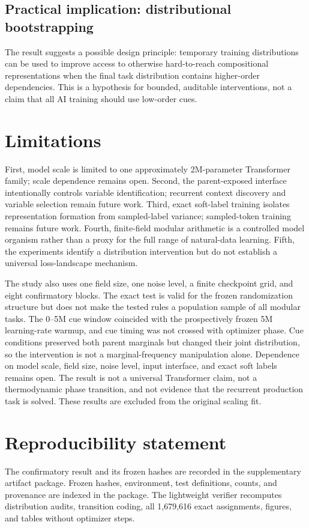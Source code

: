\documentclass[11pt]{article}
\begin{document}
\subsection{Practical implication: distributional bootstrapping}
The result suggests a possible design principle: temporary training
distributions can be used to improve access to otherwise hard-to-reach
compositional representations when the final task distribution contains
higher-order dependencies. This is a hypothesis for bounded, auditable
interventions, not a claim that all AI training should use low-order cues.

\section{Limitations}
First, model scale is limited to one approximately 2M-parameter Transformer
family; scale dependence remains open. Second, the parent-exposed interface
intentionally controls variable identification; recurrent context discovery
and variable selection remain future work. Third, exact soft-label training
isolates representation formation from sampled-label variance; sampled-token
training remains future work. Fourth, finite-field modular arithmetic is a
controlled model organism rather than a proxy for the full range of
natural-data learning. Fifth, the experiments identify a distribution
intervention but do not establish a universal loss-landscape mechanism.

The study also uses one field size, one noise level, a finite checkpoint grid,
and eight confirmatory blocks. The exact test is valid for the frozen
randomization structure but does not make the tested rules a population sample
of all modular tasks. The 0--5M cue window coincided with the prospectively
frozen 5M learning-rate warmup, and cue timing was not crossed with optimizer
phase. Cue conditions preserved both parent marginals but changed their joint
distribution, so the intervention is not a marginal-frequency manipulation
alone. Dependence on model scale, field size, noise level, input interface, and
exact soft labels remains open. The result is not a universal Transformer
claim, not a thermodynamic phase transition, and not evidence that the
recurrent production task is solved. These results are excluded from the
original scaling fit.

\section{Reproducibility statement}
The confirmatory result and its frozen hashes are recorded in the supplementary artifact package. Frozen hashes,
environment, test definitions, counts, and provenance are indexed in the
package. The lightweight verifier recomputes distribution audits, transition
coding, all 1,679,616 exact assignments, figures,
and tables without optimizer steps.
\end{document}
